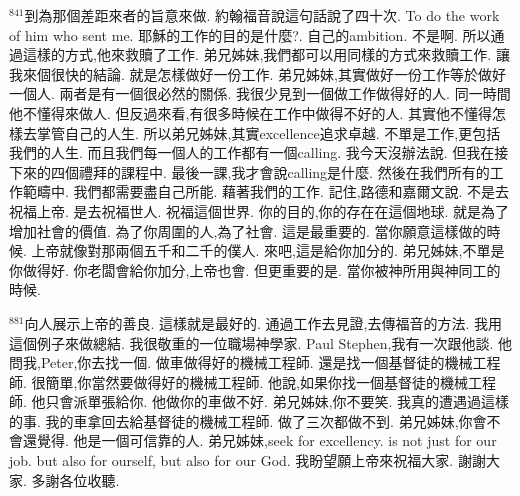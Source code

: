 \documentclass{book}
\begin{document}
$^{841}$到為那個差距來者的旨意來做.
約翰福音說這句話說了四十次.
To do the work of him who sent me.
耶穌的工作的目的是什麼?.
自己的ambition.
不是啊.
所以通過這樣的方式,他來救贖了工作.
弟兄姊妹,我們都可以用同樣的方式來救贖工作.
讓我來個很快的結論.
就是怎樣做好一份工作.
弟兄姊妹,其實做好一份工作等於做好一個人.
兩者是有一個很必然的關係.
我很少見到一個做工作做得好的人.
同一時間他不懂得來做人.
但反過來看,有很多時候在工作中做得不好的人.
其實他不懂得怎樣去掌管自己的人生.
所以弟兄姊妹,其實excellence追求卓越.
不單是工作,更包括我們的人生.
而且我們每一個人的工作都有一個calling.
我今天沒辦法說.
但我在接下來的四個禮拜的課程中.
最後一課,我才會說calling是什麼.
然後在我們所有的工作範疇中.
我們都需要盡自己所能.
藉著我們的工作.
記住,路德和嘉爾文說.
不是去祝福上帝.
是去祝福世人.
祝福這個世界.
你的目的,你的存在在這個地球.
就是為了增加社會的價值.
為了你周圍的人,為了社會.
這是最重要的.
當你願意這樣做的時候.
上帝就像對那兩個五千和二千的僕人.
來吧,這是給你加分的.
弟兄姊妹,不單是你做得好.
你老闆會給你加分,上帝也會.
但更重要的是.
當你被神所用與神同工的時候.

$^{881}$向人展示上帝的善良.
這樣就是最好的.
通過工作去見證,去傳福音的方法.
我用這個例子來做總結.
我很敬重的一位職場神學家.
Paul Stephen,我有一次跟他談.
他問我,Peter,你去找一個.
做車做得好的機械工程師.
還是找一個基督徒的機械工程師.
很簡單,你當然要做得好的機械工程師.
他說,如果你找一個基督徒的機械工程師.
他只會派單張給你.
他做你的車做不好.
弟兄姊妹,你不要笑.
我真的遭遇過這樣的事.
我的車拿回去給基督徒的機械工程師.
做了三次都做不到.
弟兄姊妹,你會不會還覺得.
他是一個可信靠的人.
弟兄姊妹,seek for excellency.
is not just for our job.
but also for ourself, but also for our God.
我盼望願上帝來祝福大家.
謝謝大家.
多謝各位收聽.
\newpage
\end{document}
